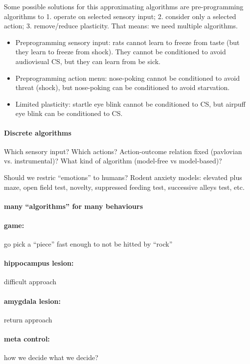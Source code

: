 \documentclass[12pt,article,oneside,a4paper]{memoir}
\begin{document}
Some possible solutions for this approximating algorithms are pre-programming
algorithms to 1. operate on selected sensory input; 2. consider only a selected 
action; 3. remove/reduce plasticity. That means: we need multiple algorithms.

\begin{itemize}
\item Preprogramming sensory input: rats cannot learn to freeze from taste
(but they learn to freeze from shock). They cannot be conditioned to avoid
audiovisual CS, but they can learn from be sick.
\item Preprogramming action menu: nose-poking cannot be conditioned to avoid
threat (shock), but nose-poking can be conditioned to avoid starvation.
\item Limited plasticity: startle eye blink cannot be conditioned to CS, but
airpuff eye blink can be conditioned to CS.
\end{itemize}

\paragraph{Discrete algorithms}
Which sensory input? Which actions? Action-outcome relation fixed
(pavlovian vs. instrumental)? What kind of algorithm (model-free vs
model-based)?

Should we restric ``emotions'' to humans?
Rodent anxiety models: elevated plus maze, open field test, novelty, suppressed
feeding test, successive alleys test, etc.

\paragraph{many ``algorithms'' for many behaviours}
\paragraph{game:} go pick a ``piece'' fast enough to not be hitted by ``rock''
\paragraph{hippocampus lesion:} difficult approach
\paragraph{amygdala lesion:} return approach

\paragraph{meta control:} how we decide what we decide?
\end{document}

